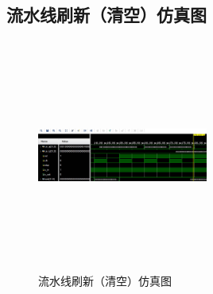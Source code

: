 \subsection{流水线刷新（清空）仿真图}
\begin{figure}[htbp]
    \centering
    \includegraphics[width=0.5\textwidth,height=3in,keepaspectratio]{reset.jpg}
    \caption{流水线刷新（清空）仿真图}
    \label{image2}
\end{figure}
